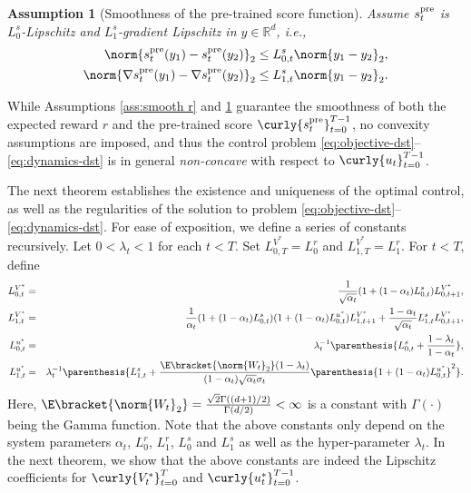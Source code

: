 \documentclass{article}
\newtheorem{Assumption}[Theorem]{Assumption}
\newcommand{\R}{\mathbb{R}}
\begin{document}
\begin{Assumption}[Smoothness of the pre-trained score function]\label{ass:smooth s}
    Assume $s_t^{\rm pre}$ is $L_{0}^{s}$-Lipschitz and $L_{1}^{s}$-gradient Lipschitz in $y \in \R^d$, i.e.,
    \begin{align}
        \norm{s_t^{\rm pre}(y_1) - s_t^{\rm pre}(y_2) }_2 \leq L_{0,t}^{s}\norm{y_1 - y_2}_2, \\ 
        \norm{\nabla s_t^{\rm pre}(y_1) - \nabla s_t^{\rm pre}(y_2) }_2 \leq L_{1,t}^{s}\norm{y_1 - y_2}_2.
    \end{align}
\end{Assumption}

While Assumptions \ref{ass:smooth r} and \ref{ass:smooth s} guarantee the smoothness of both the expected reward $r$ and the pre-trained score $\curly{s_t^{\rm pre}}_{t=0}^{T-1}$, no convexity assumptions are imposed, and thus the control problem \eqref{eq:objective-dst}--\eqref{eq:dynamics-dst} is in general {\it non-concave} with respect to $\curly{u_t}_{t=0}^{T-1}$.

The next theorem establishes the existence and uniqueness of the optimal control, as well as the regularities of the solution to problem \eqref{eq:objective-dst}--\eqref{eq:dynamics-dst}. For ease of exposition, we define  a series of constants recursively. Let $0 < \lambda_t < 1$ for each $ t < T$. Set $L_{0, T}^{V^{*}} = L_0^r$ and $L_{1, T}^{V^{*}} = L_1^r$. For $ t < T$, define
\begin{eqnarray}
    L_{0,t}^{V^{*}} &=& \frac{1}{\sqrt{\alpha_t}}(1 + (1 - \alpha_t)L_{0, t}^s)L_{0, t+1}^{V^{*}}, \label{eq:LV0star}\\ 
    L_{1, t}^{V^{*}} &=& \frac{1}{\alpha_{t}}(1 + (1 - \alpha_{t})L_{0, t}^s)(1 + (1 - \alpha_{t})L_{0, t}^{u^{*}})L_{1,t+1}^{V^{*}} + \frac{1 - \alpha_{t}}{\sqrt{\alpha_{t}}}L_{1, t}^s L_{0,t+1}^{V^{*}},\label{eq:LV1star} \\ 
    L_{0, t}^{u^*} & =& \lambda_{t}^{-1}\parenthesis{L_{0, t}^s + \frac{1 - \lambda_t}{1- \alpha_t}}, \label{eq:Lu0star}\\ 
    L_{1, t}^{u^*}  &= & \lambda_{t}^{-1}\parenthesis{L_{1, t}^{s} +  \frac{\E\bracket{\norm{W_{t}}_2}(1 - \lambda_t)}{(1 - \alpha_t)\sqrt{\alpha_{t}}\sigma_{t}}\parenthesis{1 + (1 - \alpha_{t})L_{0,t}^{u^{*}}}^{2}}.\label{eq:Lu1star}
\end{eqnarray}
Here, $\E\bracket{\norm{W_t}_2} = \frac{\sqrt{2}\Gamma((d+1)/2)}{\Gamma(d/2)} < \infty $ is a constant with $\Gamma(\cdot)$ being the Gamma function. Note that the above constants only depend on the system parameters $\alpha_t$, $L_0^r$, $L_1^r$, $L_0^s$ and $L_1^s$ as well as the hyper-parameter $\lambda_t$. In the next theorem, we show that the above constants are indeed the Lipschitz coefficients for $\curly{V_t^{*}}_{t = 0}^{T}$ and $\curly{u_t^{*}}_{t=0}^{T-1}$.
%
\end{document}
